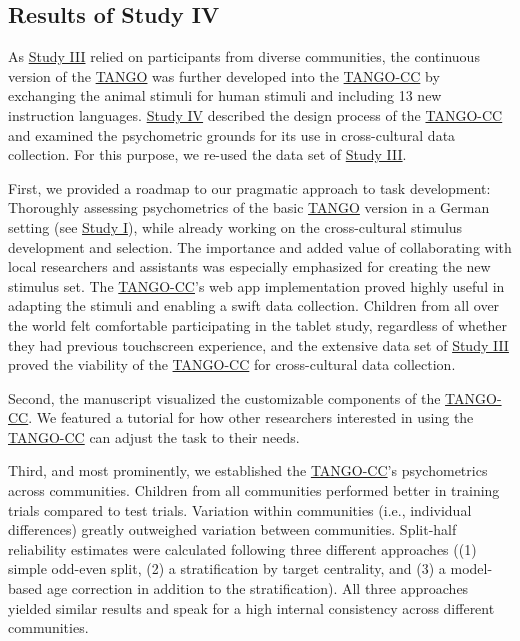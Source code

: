 \documentclass[
]{scrbook}
\begin{document}
\subsection{Results of Study IV}\label{results-studyIV}

As \hyperref[studyIII]{Study III} relied on participants from diverse communities, the continuous version of the \hyperref[acronyms_TANGO]{TANGO} was further developed into the \hyperref[acronyms_TANGO-CC]{TANGO-CC} by exchanging the animal stimuli for human stimuli and including 13 new instruction languages. \hyperref[studyIV]{Study IV} described the design process of the \hyperref[acronyms_TANGO-CC]{TANGO-CC} and examined the psychometric grounds for its use in cross-cultural data collection. For this purpose, we re-used the data set of \hyperref[studyIII]{Study III}.

First, we provided a roadmap to our pragmatic approach to task development: Thoroughly assessing psychometrics of the basic \hyperref[acronyms_TANGO]{TANGO} version in a German setting (see \hyperref[studyI]{Study I}), while already working on the cross-cultural stimulus development and selection. The importance and added value of collaborating with local researchers and assistants was especially emphasized for creating the new stimulus set. The \hyperref[acronyms_TANGO-CC]{TANGO-CC}'s web app implementation proved highly useful in adapting the stimuli and enabling a swift data collection. Children from all over the world felt comfortable participating in the tablet study, regardless of whether they had previous touchscreen experience, and the extensive data set of \hyperref[studyIII]{Study III} proved the viability of the \hyperref[acronyms_TANGO-CC]{TANGO-CC} for cross-cultural data collection.

Second, the manuscript visualized the customizable components of the \hyperref[acronyms_TANGO-CC]{TANGO-CC}. We featured a tutorial for how other researchers interested in using the \hyperref[acronyms_TANGO-CC]{TANGO-CC} can adjust the task to their needs.

Third, and most prominently, we established the \hyperref[acronyms_TANGO-CC]{TANGO-CC}'s psychometrics across communities. Children from all communities performed better in training trials compared to test trials. Variation within communities (i.e., individual differences) greatly outweighed variation between communities. Split-half reliability estimates were calculated following three different approaches ((1) simple odd-even split, (2) a stratification by target centrality, and (3) a model-based age correction in addition to the stratification). All three approaches yielded similar results and speak for a high internal consistency across different communities.
\end{document}
